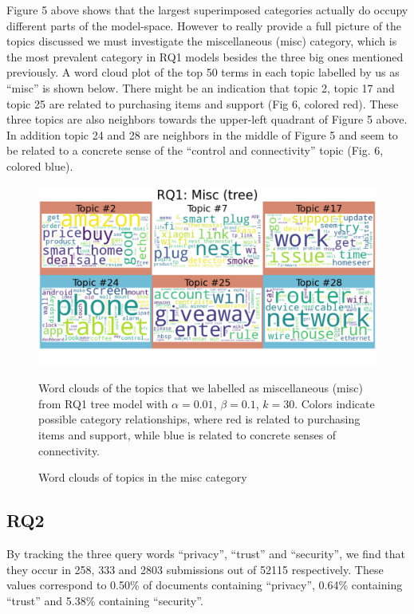 \documentclass{article}
\begin{document}
Figure 5 above shows that the largest superimposed categories actually do occupy different parts of the model-space. However to really provide a full picture of the topics discussed we must investigate the miscellaneous (misc) category, which is the most prevalent category in RQ1 models besides the three big ones mentioned previously. A word cloud plot of the top 50 terms in each topic labelled by us as “misc” is shown below. There might be an indication that topic 2, topic 17 and topic 25 are related to purchasing items and support (Fig 6, colored red). These three topics are also neighbors towards the upper-left quadrant of Figure 5 above. In addition topic 24 and 28 are neighbors in the middle of Figure 5 and seem to be related to a concrete sense of the “control and connectivity” topic (Fig. 6, colored blue). 

\begin{figure}[H]
    \begin{centering}
    \includegraphics[scale=0.3]{../Figure/tree_misc_red.png}
    \caption{Word clouds of topics in the misc category}
    \end{centering}
    \begin{footnotesize} 
        Word clouds of the topics that we labelled as miscellaneous (misc) from RQ1 tree model with $\alpha = 0.01$, $\beta = 0.1$, $k = 30$. Colors indicate possible category relationships, where red is related to purchasing items and support, while blue is related to concrete senses of connectivity. 
    \end{footnotesize}
\end{figure}

    \subsection{RQ2}
    By tracking the three query words “privacy”, “trust” and “security”, we find that they occur in 258, 333 and 2803 submissions out of 52115 respectively. These values correspond to 0.50\% of documents containing “privacy”, 0.64\% containing “trust” and 5.38\% containing “security”. 
\end{document}
